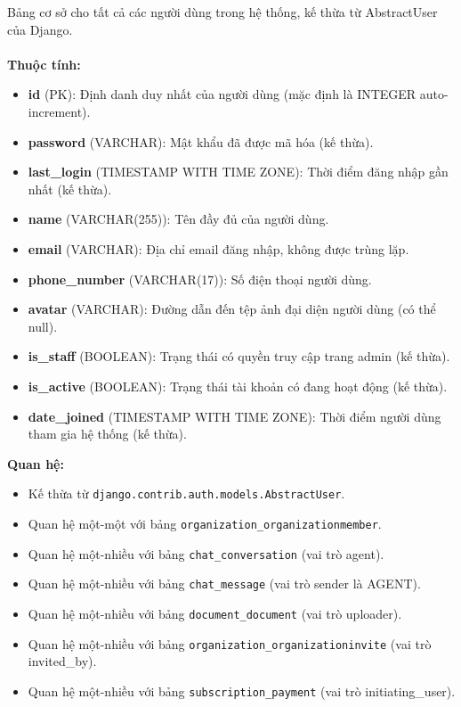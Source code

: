 Bảng cơ sở cho tất cả các người dùng trong hệ thống, kế thừa từ AbstractUser của Django. \\\\
\indent\textbf{Thuộc tính:}
\begin{itemize}
    \item \textbf{id} (PK): Định danh duy nhất của người dùng (mặc định là INTEGER auto-increment).
    \item \textbf{password} (VARCHAR): Mật khẩu đã được mã hóa (kế thừa).
    \item \textbf{last\_login} (TIMESTAMP WITH TIME ZONE): Thời điểm đăng nhập gần nhất (kế thừa).
    \item \textbf{name} (VARCHAR(255)): Tên đầy đủ của người dùng.
    \item \textbf{email} (VARCHAR): Địa chỉ email đăng nhập, không được trùng lặp.
    \item \textbf{phone\_number} (VARCHAR(17)): Số điện thoại người dùng.
    \item \textbf{avatar} (VARCHAR): Đường dẫn đến tệp ảnh đại diện người dùng (có thể null).
    \item \textbf{is\_staff} (BOOLEAN): Trạng thái có quyền truy cập trang admin (kế thừa).
    \item \textbf{is\_active} (BOOLEAN): Trạng thái tài khoản có đang hoạt động (kế thừa).
    \item \textbf{date\_joined} (TIMESTAMP WITH TIME ZONE): Thời điểm người dùng tham gia hệ thống (kế thừa).
\end{itemize}
\textbf{Quan hệ:}
\begin{itemize}
    \item Kế thừa từ \texttt{django.contrib.auth.models.AbstractUser}.
    \item Quan hệ một-một với bảng \texttt{organization\_organizationmember}.
    \item Quan hệ một-nhiều với bảng \texttt{chat\_conversation} (vai trò agent).
    \item Quan hệ một-nhiều với bảng \texttt{chat\_message} (vai trò sender là AGENT).
    \item Quan hệ một-nhiều với bảng \texttt{document\_document} (vai trò uploader).
    \item Quan hệ một-nhiều với bảng \texttt{organization\_organizationinvite} (vai trò invited\_by).
    \item Quan hệ một-nhiều với bảng \texttt{subscription\_payment} (vai trò initiating\_user).
\end{itemize}

